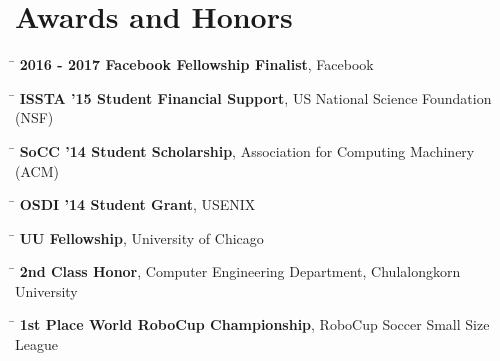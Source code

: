 \documentclass[10pt]{article} %
\begin{document}

\section{Awards and Honors}

\begin{tabbing}
\hspace{2.5cm} \=  \> \textbf{2016 - 2017 Facebook Fellowship Finalist}, Facebook
\end{tabbing}

\begin{tabbing}
\hspace{2.5cm} \=  \> \textbf{ISSTA '15 Student Financial Support}, US National Science Foundation (NSF)
\end{tabbing}

\begin{tabbing}
\hspace{2.5cm} \=  \> \textbf{SoCC '14 Student Scholarship}, Association for Computing Machinery (ACM)
\end{tabbing}

\begin{tabbing}
\hspace{2.5cm} \=  \> \textbf{OSDI '14 Student Grant}, USENIX
\end{tabbing}

\begin{tabbing}
\hspace{2.5cm} \=  \> \textbf{UU Fellowship}, University of Chicago
\end{tabbing}

\begin{tabbing}
\hspace{2.5cm} \=  \> \textbf{2nd Class Honor}, Computer Engineering Department, Chulalongkorn University
\end{tabbing}

\begin{tabbing}
\hspace{2.5cm} \=  \> \textbf{1st Place World RoboCup Championship}, RoboCup Soccer Small Size League
\end{tabbing}

\end{document}
